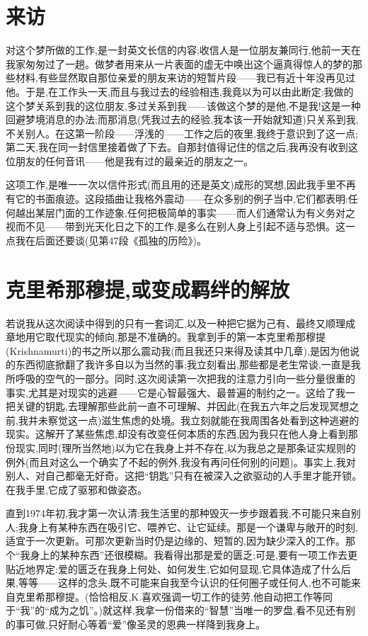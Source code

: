 \section{来访}

对这个梦所做的工作,是一封英文长信的内容;收信人是一位朋友兼同行,他前一天在我家匆匆过了一趟。做梦者用来从一片表面的虚无中唤出这个逼真得惊人的梦的那些材料,有些显然取自那位亲爱的朋友来访的短暂片段——我已有近十年没再见过他。于是,在工作头一天,而且与我过去的经验相违,我竟以为可以由此断定:我做的这个梦关系到我的这位朋友,多过关系到我——该做这个梦的是他,不是我!这是一种回避梦境消息的办法;而那消息(凭我过去的经验,我本该一开始就知道)只关系到我,不关别人。在这第一阶段——浮浅的——工作之后的夜里,我终于意识到了这一点;第二天,我在同一封信里接着做了下去。自那封值得记住的信之后,我再没有收到这位朋友的任何音讯——他是我有过的最亲近的朋友之一。

这项工作,是唯一一次以信件形式(而且用的还是英文)成形的冥想,因此我手里不再有它的书面痕迹。这段插曲让我格外震动——在众多别的例子当中,它们都表明:任何越出某层门面的工作迹象,任何把极简单的事实——而人们通常认为有义务对之视而不见——带到光天化日之下的工作,是多么在别人身上引起不适与恐惧。这一点我在后面还要谈(见第47段《孤独的历险》)。

\section{克里希那穆提,或变成羁绊的解放}

若说我从这次阅读中得到的只有一套词汇,以及一种把它据为己有、最终又顺理成章地用它取代现实的倾向,那是不准确的。我拿到手的第一本克里希那穆提(Krishnamurti)的书之所以那么震动我(而且我还只来得及读其中几章),是因为他说的东西彻底掀翻了我许多自以为当然的事;我立刻看出,那些都是老生常谈,一直是我所呼吸的空气的一部分。同时,这次阅读第一次把我的注意力引向一些分量很重的事实,尤其是对现实的逃避——它是心智最强大、最普遍的制约之一。这给了我一把关键的钥匙,去理解那些此前一直不可理解、并因此(在我五六年之后发现冥想之前,我并未察觉这一点)滋生焦虑的处境。我立刻就能在我周围各处看到这种逃避的现实。这解开了某些焦虑,却没有改变任何本质的东西,因为我只在他人身上看到那份现实,同时(理所当然地)以为它在我身上并不存在,以为我总之是那条证实规则的例外(而且对这么一个确实了不起的例外,我没有再问任何别的问题)。事实上,我对别人、对自己都毫无好奇。这把“钥匙”只有在被深入之欲驱动的人手里才能开锁。在我手里,它成了驱邪和做姿态。

直到1974年初,我才第一次认清:我生活里的那种毁灭一步步跟着我,不可能只来自别人;我身上有某种东西在吸引它、喂养它、让它延续。那是一个谦卑与敞开的时刻,适宜于一次更新。可那次更新当时仍是边缘的、短暂的,因为缺少深入的工作。那个“我身上的某种东西”还很模糊。我看得出那是爱的匮乏;可是,要有一项工作去更贴近地界定:爱的匮乏在我身上何处、如何发生,它如何显现,它具体造成了什么后果,等等——这样的念头,既不可能来自我至今认识的任何圈子或任何人,也不可能来自克里希那穆提。(恰恰相反,K.喜欢强调一切工作的徒劳,他自动把工作等同于“我”的“成为之饥”。)就这样,我拿一份借来的“智慧”当唯一的罗盘,看不见还有别的事可做,只好耐心等着“爱”像圣灵的恩典一样降到我身上。

